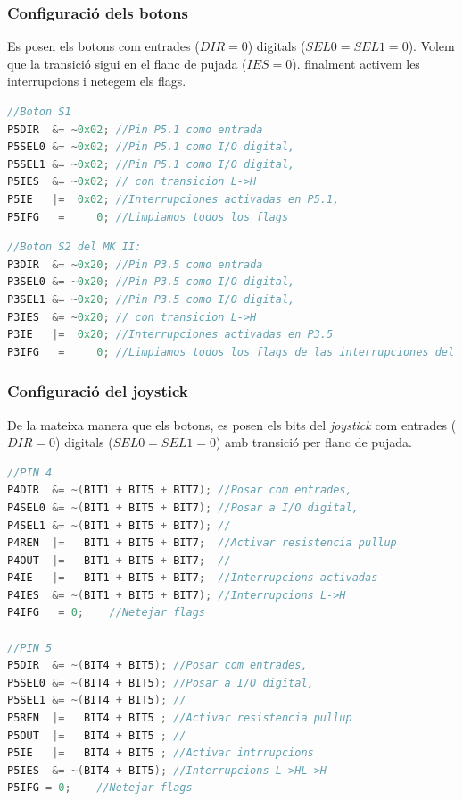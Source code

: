 \documentclass[12pt,a4paper]{article}
\begin{document}
\subsubsection{Configuració dels botons}

Es posen els botons com entrades ($DIR = 0$) digitals ($SEL0 = SEL1 = 0$). Volem que la transició sigui en el flanc de pujada ($IES = 0$). finalment activem les interrupcions i netegem els flags.

\begin{lstlisting}[language=C]
//Boton S1
P5DIR  &= ~0x02; //Pin P5.1 como entrada
P5SEL0 &= ~0x02; //Pin P5.1 como I/O digital,
P5SEL1 &= ~0x02; //Pin P5.1 como I/O digital,
P5IES  &= ~0x02; // con transicion L->H
P5IE   |=  0x02; //Interrupciones activadas en P5.1,
P5IFG   =     0; //Limpiamos todos los flags
\end{lstlisting}

\begin{lstlisting}[language=C]
//Boton S2 del MK II:
P3DIR  &= ~0x20; //Pin P3.5 como entrada
P3SEL0 &= ~0x20; //Pin P3.5 como I/O digital,
P3SEL1 &= ~0x20; //Pin P3.5 como I/O digital,
P3IES  &= ~0x20; // con transicion L->H
P3IE   |=  0x20; //Interrupciones activadas en P3.5
P3IFG   =     0; //Limpiamos todos los flags de las interrupciones del puerto 3
\end{lstlisting}

\subsubsection{Configuració del joystick}

De la mateixa manera que els botons, es posen els bits del \textit{joystick} com entrades ($DIR = 0$) digitals ($SEL0 = SEL1 = 0$) amb transició per flanc de pujada.
\begin{lstlisting}[language=C]
//PIN 4
P4DIR  &= ~(BIT1 + BIT5 + BIT7); //Posar com entrades,
P4SEL0 &= ~(BIT1 + BIT5 + BIT7); //Posar a I/O digital,
P4SEL1 &= ~(BIT1 + BIT5 + BIT7); //
P4REN  |=   BIT1 + BIT5 + BIT7;  //Activar resistencia pullup
P4OUT  |=   BIT1 + BIT5 + BIT7;  //
P4IE   |=   BIT1 + BIT5 + BIT7;  //Interrupcions activadas
P4IES  &= ~(BIT1 + BIT5 + BIT7); //Interrupcions L->H
P4IFG   = 0;    //Netejar flags

//PIN 5
P5DIR  &= ~(BIT4 + BIT5); //Posar com entrades,
P5SEL0 &= ~(BIT4 + BIT5); //Posar a I/O digital,
P5SEL1 &= ~(BIT4 + BIT5); //
P5REN  |=   BIT4 + BIT5 ; //Activar resistencia pullup
P5OUT  |=   BIT4 + BIT5 ; //
P5IE   |=   BIT4 + BIT5 ; //Activar intrrupcions
P5IES  &= ~(BIT4 + BIT5); //Interrupcions L->HL->H
P5IFG = 0;    //Netejar flags
\end{lstlisting}
\end{document}
